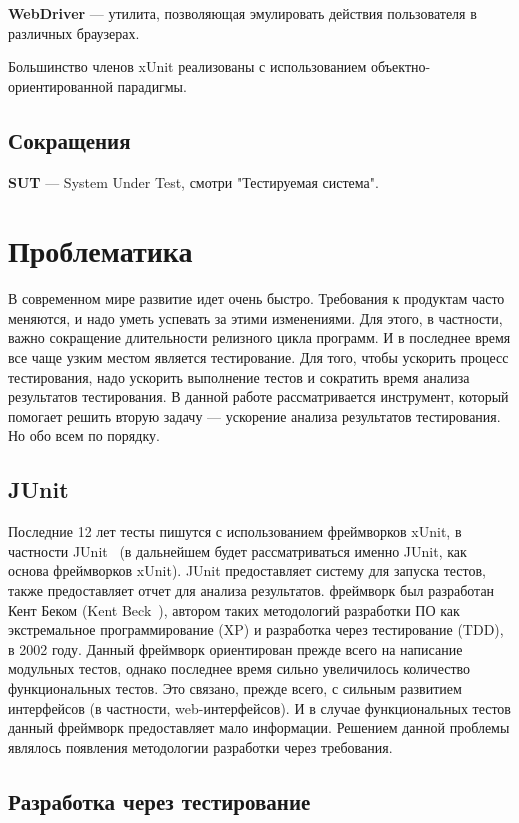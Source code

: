 {\bf WebDriver} ---
утилита, позволяющая эмулировать действия пользователя в различных браузерах.

Большинство членов xUnit реализованы с использованием объектно-ориентированной парадигмы.

\subsection{Сокращения}

{\bf SUT} --- System Under Test, смотри "Тестируемая система".

\section{Проблематика}

В современном мире развитие идет очень быстро. Требования к продуктам часто меняются, и надо уметь успевать за этими изменениями. Для этого, в частности, важно сокращение длительности релизного цикла программ. И в последнее время все чаще узким местом является тестирование. Для того, чтобы ускорить процесс тестирования, надо ускорить выполнение тестов и сократить время анализа результатов тестирования. В данной работе рассматривается инструмент, который помогает решить вторую задачу --- ускорение анализа результатов тестирования. Но обо всем по порядку.

\subsection{JUnit}

Последние 12 лет тесты пишутся с использованием фреймворков xUnit, в частности JUnit~\cite{junit_home} (в дальнейшем будет рассматриваться именно JUnit, как основа фреймворков xUnit). JUnit предоставляет систему для запуска тестов, также предоставляет отчет для анализа результатов. 
фреймворк был разработан Кент Беком (Kent Beck~\cite{kent_beck}), автором таких методологий разработки ПО как экстремальное программирование (XP) и разработка через тестирование (TDD), в 2002 году. 
Данный фреймворк ориентирован прежде всего на написание модульных тестов, однако последнее время сильно увеличилось количество функциональных тестов. Это связано, прежде всего, с сильным развитием интерфейсов (в частности, web-интерфейсов). И в случае функциональных тестов данный фреймворк предоставляет мало информации. Решением данной проблемы являлось появления методологии разработки через требования.

\subsection{Разработка через тестирование}

